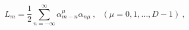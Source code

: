 \begin{equation}
L_{m} = \frac{1}{2} \sum_{n=-\infty}^{\infty} \alpha_{m-n}^{\mu} \alpha_{n \mu}~,~~~ (\mu = 0 , 1, \ldots, D-1)~, 
\end{equation}

